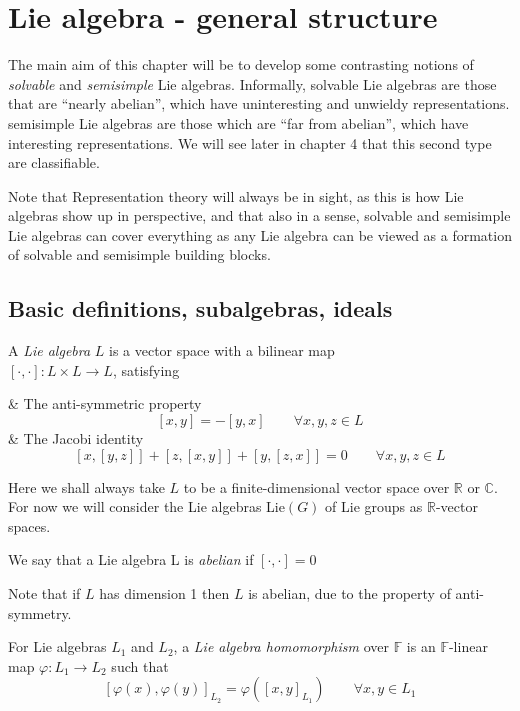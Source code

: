 \chapter{Lie algebra - general structure}
The main aim of this chapter will be to develop some contrasting notions of \emph{solvable} and \emph{semisimple} Lie algebras.
Informally, solvable Lie algebras are those that are ``nearly abelian'', which have uninteresting and unwieldy representations.
semisimple Lie algebras are those which are ``far from abelian'', which have interesting representations.
We will see later in chapter 4 that this second type are classifiable.

Note that Representation theory will always be in sight, as this is how Lie algebras show up in perspective, and that also in a sense, solvable and semisimple Lie algebras can cover everything as any Lie algebra can be viewed as a formation of solvable and semisimple building blocks.

\section{Basic definitions, subalgebras, ideals}

\begin{defn}
	A \emph{Lie algebra} $L$ is a vector space with a bilinear map \\ $[\cdot, \cdot] : L \times L \to L$, satisfying 
	\begin{easylist}[enumerate]
		& The anti-symmetric property
		\[ [x,y] = -[y,x] \qquad \forall x,y,z \in L \]
		& The Jacobi identity
		\[ [x,[y,z]] + [z,[x,y]] + [y,[z,x]] = 0 \qquad \forall x,y,z \in L \]
	\end{easylist}
\end{defn} 

Here we shall always take $L$ to be a finite-dimensional vector space over $\mathbb{R}$ or $\mathbb{C}$.
For now we will consider the Lie algebras Lie$(G)$ of Lie groups as $\mathbb{R}$-vector spaces.

\begin{defn}
	We say that a Lie algebra L is \emph{abelian} if $[\cdot,\cdot] = 0$
\end{defn}

Note that if $L$ has dimension 1 then $L$ is abelian, due to the property of anti-symmetry.

\begin{defn}
	For Lie algebras $L_1$ and $L_2$, a \emph{Lie algebra homomorphism} over $\mathbb{F}$ is an $\mathbb{F}$-linear map $\varphi : L_1 \to L_2$ such that
		\[ [\varphi(x), \varphi(y)]_{L_2} = \varphi([x,y]_{L_1}) \qquad \forall x,y \in L_1 \]
\end{defn}

